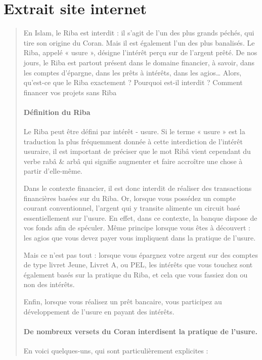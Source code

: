 \section{Extrait site internet}
\begin{quote}
En Islam, le Riba est interdit : il s’agit de l’un des plus grands péchés, qui tire son origine du Coran. Mais il est également l’un des plus banalisés. Le Riba, appelé « usure », désigne l’intérêt perçu sur de l’argent prêté. De nos jours, le Riba est partout présent dans le domaine financier, à savoir, dans les comptes d’épargne, dans les prêts à intérêts, dans les agios… Alors, qu’est-ce que le Riba exactement ? Pourquoi est-il interdit ? Comment financer vos projets sans Riba 
\paragraph{Définition du Riba}

Le Riba peut être défini par intérêt - usure. Si le terme « usure » est la traduction la plus fréquemment donnée à cette interdiction de l’intérêt usuraire, il est important de préciser que le mot Ribâ vient cependant du verbe rabâ \& arbâ qui signifie augmenter et faire accroître une chose à partir d’elle-même. 

Dans le contexte financier, il est donc interdit de réaliser des transactions financières basées sur du Riba. Or, lorsque vous possédez un compte courant conventionnel, l’argent qui y transite alimente un circuit basé essentiellement sur l’usure. En effet, dans ce contexte, la banque dispose de vos fonds afin de spéculer. Même principe lorsque vous êtes à découvert : les agios que vous devez payer vous impliquent dans la pratique de l’usure.

Mais ce n’est pas tout : lorsque vous épargnez votre argent sur des comptes de type livret Jeune, Livret A, ou PEL, les intérêts que vous touchez sont également basés sur la pratique du Riba, et cela que vous fassiez don ou non des intérêts.

Enfin, lorsque vous réalisez un prêt bancaire, vous participez au développement de l’usure en payant des intérêts. 

\paragraph{De nombreux versets du Coran interdisent la pratique de l’usure.}     En voici quelques-uns, qui sont particulièrement explicites :


\end{quote}
